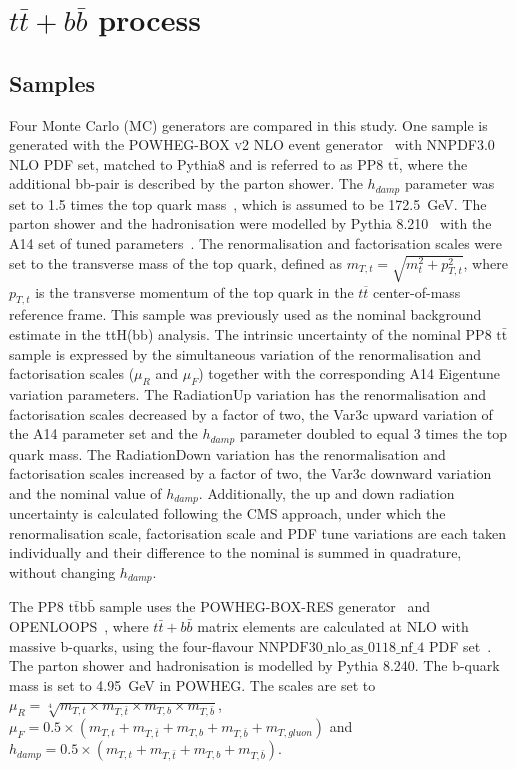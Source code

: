 \section{$t\bar{t}+b\bar{b}$ process}
\label{sec:ttbb}

\subsection{Samples}
Four Monte Carlo (MC) generators are compared in this study. %
One sample is generated with the \textsc{POWHEG-BOX v2} NLO event generator~\cite{Nason:2004rx,Frixione:2007vw,Alioli:2010xd,Campbell:2014kua} with NNPDF3.0 NLO PDF set, matched to Pythia8 and is referred to as PP8 $\mathrm{t\bar{t}}$, where the additional bb-pair is described by the parton shower. The $h_{damp}$ parameter was set to 1.5 times the top quark mass~\cite{ATL-PHYS-PUB-2016-020}, which is assumed to be 172.5~GeV. The parton shower and the hadronisation were modelled by Pythia 8.210~\cite{PhysRevD.78.014026} with the A14 set of tuned parameters~\cite{ATL-PHYS-PUB-2014-021}. The renormalisation and factorisation scales were set to the transverse mass of the top quark, defined as $m_{T,t} = \sqrt{m^2_t + p^2_{T,t}}$, where $p_{T,t}$ is the transverse momentum of the top quark in the $t\overline{t}$ center-of-mass reference frame. This sample was previously used as the nominal background estimate in the ttH(bb) analysis.
The intrinsic uncertainty of the nominal PP8 $\mathrm{t\bar{t}}$ sample is expressed by the simultaneous variation of the renormalisation and factorisation scales ($\mu_R$ and $\mu_F$) together with the corresponding A14 Eigentune variation parameters. The RadiationUp variation has the renormalisation and factorisation scales decreased by a factor of two, the Var3c upward variation of the A14 parameter set and the $h_{damp}$ parameter doubled to equal 3 times the top quark mass. The RadiationDown variation has the renormalisation and factorisation scales increased by a factor of two, the Var3c downward variation and the nominal value of $h_{damp}$.
Additionally, the up and down radiation uncertainty is calculated following the CMS approach, under which the renormalisation scale, factorisation scale and PDF tune variations are each taken individually and their difference to the nominal is summed in quadrature, without changing $h_{damp}$.

The PP8 $\mathrm{t\bar{t}b\bar{b}}$ sample uses the \textsc{POWHEG-BOX-RES} generator~\cite{jeo2015treatment} and \textsc{OPENLOOPS}~\cite{Cascioli:2011va}, where $t\bar{t}+b\bar{b}$ matrix elements are calculated at NLO with massive b-quarks, using the four-flavour $\textrm{NNPDF30\_nlo\_as\_0118\_nf\_4}$ PDF set~\cite{Jezo:2018yaf}. The parton shower and hadronisation is modelled by Pythia 8.240. The b-quark mass is set to 4.95~GeV in \textsc{POWHEG}. The scales are set to $\mu_R=\sqrt[4]{m_{T,t}\times m_{T,\bar{t}}\times m_{T,b}\times m_{T,\bar{b}} }$, $\mu_F=0.5\times(m_{T,t}+m_{T,\bar{t}}+m_{T,b}+ m_{T,\bar{b}}+m_{T,gluon})$ and $h_{damp}=0.5\times(m_{T,t}+m_{T,\bar{t}}+m_{T,b}+ m_{T,\bar{b}})$.

